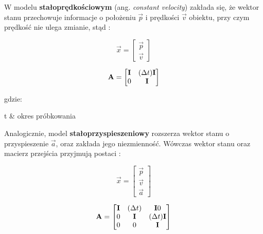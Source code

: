 W modelu \textbf{stałoprędkościowym} (ang. \textit{constant velocity}) zakłada się, że wektor stanu przechowuje informacje o położeniu $\vec{p}$ i prędkości $\vec{v}$ obiektu, przy czym prędkość nie ulega zmianie, stąd \cite{Forsyth2012}:

\begin{equation}
\label{equ:Filtr_Kalmana_model_stalopredkosciowy_wektor_stanu}
	\vec{x} = \begin{bmatrix}
		\vec{p} \\
		\vec{v}
	\end{bmatrix}
\end{equation}

\begin{equation}
\label{equ:Filtr_Kalmana_model_stalopredkosciowy_macierz_przejscia}
	\mathbf{A} = \begin{bmatrix}
		\mathbf{I} & (\Delta t) \mathbf{I} \\
		0 & \mathbf{I}
	\end{bmatrix}
\end{equation}

\noindent
gdzie:

\begin{conditions}
	\Delta t & okres próbkowania \\
\end{conditions}

Analogicznie, model \textbf{stałoprzyspieszeniowy} rozszerza wektor stanu o przyspieszenie $\vec{a}$, oraz zakłada jego niezmienność. Wówczas wektor stanu oraz macierz przejścia przyjmują postaci \cite{Forsyth2012}:

\begin{equation}
\label{equ:Filtr_Kalmana_model_staloprzyspieszeniowy_wektor_stanu}
	\vec{x} = \begin{bmatrix}
		\vec{p} \\
		\vec{v} \\
		\vec{a} 
	\end{bmatrix}
\end{equation}

\begin{equation}
\label{equ:Filtr_Kalmana_model_staloprzyspieszeniowy_macierz_przejscia}
	\mathbf{A} = \begin{bmatrix}
		\mathbf{I} & (\Delta t) & \mathbf{I} 0 \\
		0 & \mathbf{I} & (\Delta t) \mathbf{I} \\
		0 & 0 & \mathbf{I}
	\end{bmatrix}
\end{equation}

